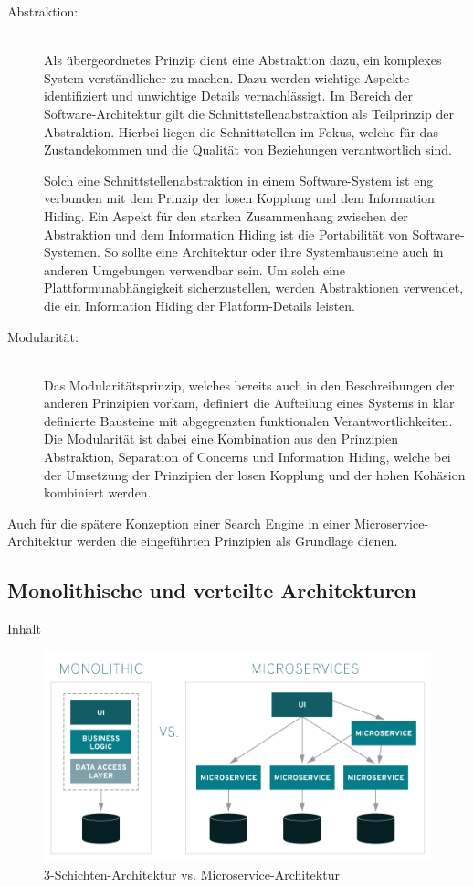 \begin{description}
    \item[Abstraktion:]\hfill \\
    Als übergeordnetes Prinzip dient eine Abstraktion dazu, ein komplexes System verständlicher zu machen. Dazu werden wichtige Aspekte identifiziert und unwichtige Details vernachlässigt. Im Bereich der Software-Architektur gilt die Schnittstellenabstraktion als Teilprinzip der Abstraktion. Hierbei liegen die Schnittstellen im Fokus, welche für das Zustandekommen und die Qualität von Beziehungen verantwortlich sind.

    Solch eine Schnittstellenabstraktion in einem Software-System ist eng verbunden mit dem Prinzip der losen Kopplung und dem Information Hiding. Ein Aspekt für den starken Zusammenhang zwischen der Abstraktion und dem Information Hiding ist die Portabilität von Software-Systemen. So sollte eine Architektur oder ihre Systembausteine auch in anderen Umgebungen verwendbar sein. Um solch eine Plattformunabhängigkeit sicherzustellen, werden Abstraktionen verwendet, die ein Information Hiding der Platform-Details leisten.

    \item[Modularität:]\hfill \\
    Das Modularitätsprinzip, welches bereits auch in den Beschreibungen der anderen Prinzipien vorkam, definiert die Aufteilung eines Systems in klar definierte Bausteine mit abgegrenzten funktionalen Verantwortlichkeiten. Die Modularität ist dabei eine Kombination aus den Prinzipien Abstraktion, Separation of Concerns und Information Hiding, welche bei der Umsetzung der Prinzipien der losen Kopplung und der hohen Kohäsion kombiniert werden.

\end{description}

Auch für die spätere Konzeption einer Search Engine in einer Microservice-Architektur werden die eingeführten Prinzipien als Grundlage dienen.

\subsection{Monolithische und verteilte Architekturen\label{subsec2.1.2:Unterunterpunkt-2}}

Inhalt

\begin{figure}[H]
    \centering
    \includegraphics[width=0.7\linewidth]{images/monolithic-vs-microservices.png}
    \caption{3-Schichten-Architektur vs. Microservice-Architektur \cite{RedHatLimited.2021}}
    \label{fig:mono_vs_micro}
\end{figure}

